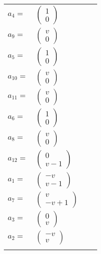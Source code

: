 \documentclass[1p]{elsarticle_modified}
\theoremstyle{definition}
\begin{document}
\begin{tabular}{m{7pt} m{180pt} m{7pt} m{180pt} }
\flushright $a_{4}=$&$\begin{pmatrix}1\\0\end{pmatrix}$ \\
\flushright $a_{9}=$&$\begin{pmatrix}v\\0\end{pmatrix}$ \\
\flushright $a_{5}=$&$\begin{pmatrix}1\\0\end{pmatrix}$ \\
\flushright $a_{10}=$&$\begin{pmatrix}v\\0\end{pmatrix}$ \\
\flushright $a_{11}=$&$\begin{pmatrix}v\\0\end{pmatrix}$ \\
\flushright $a_{6}=$&$\begin{pmatrix}1\\0\end{pmatrix}$ \\
\flushright $a_{8}=$&$\begin{pmatrix}v\\0\end{pmatrix}$ \\
\flushright $a_{12}=$&$\begin{pmatrix}0\\v-1\end{pmatrix}$ \\
\flushright $a_{1}=$&$\begin{pmatrix}- v\\v-1\end{pmatrix}$ \\
\flushright $a_{7}=$&$\begin{pmatrix}v\\- v+1\end{pmatrix}$ \\
\flushright $a_{3}=$&$\begin{pmatrix}0\\v\end{pmatrix}$ \\
\flushright $a_{2}=$&$\begin{pmatrix}- v\\v\end{pmatrix}$\\&\end{tabular}
\end{document}
